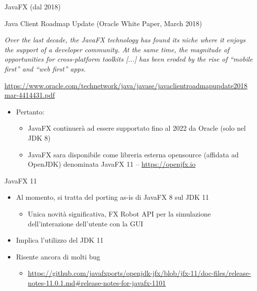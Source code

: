\documentclass[presentation]{beamer}
\begin{document}
\begin{frame}{JavaFX (dal 2018)}

\begin{block}{Java Client Roadmap Update (Oracle White Paper, March 2018)}
\begin{small}
\begin{center}
\emph{Over the last decade, the JavaFX technology has found its niche where it enjoys the support of a developer community. At the same time, the magnitude of opportunities for cross-platform toolkits [...] has been eroded by the rise of ``mobile first'' and ``web first'' apps.}
\begin{tiny}
\url{https://www.oracle.com/technetwork/java/javase/javaclientroadmapupdate2018mar-4414431.pdf}
\end{tiny}
\end{center}
\end{small}
\end{block}
%
\begin{itemize}
\item Pertanto:
\begin{itemize}
\item JavaFX continuerà ad essere supportato fino al 2022 da Oracle (solo nel JDK 8)
\item JavaFX sara disponibile come libreria esterna opensource (affidata ad OpenJDK) denominata JavaFX 11 -- \url{https://openjfx.io}
\end{itemize}
\end{itemize}
\end{frame}

\begin{frame}{JavaFX 11}
\begin{itemize}\itemsep10pt
\item Al momento, si tratta del porting as-is di JavaFX 8 sul JDK 11
\begin{itemize}
\item Unica novità significativa, FX Robot API per la simulazione dell'interazione dell'utente con la GUI
\end{itemize}
\item Implica l'utilizzo del JDK 11
\item Risente ancora di molti bug 
\begin{itemize}
\item \url{https://github.com/javafxports/openjdk-jfx/blob/jfx-11/doc-files/release-notes-11.0.1.md\#release-notes-for-javafx-1101}
\end{itemize}
\end{itemize}
\end{frame}
\end{document}
